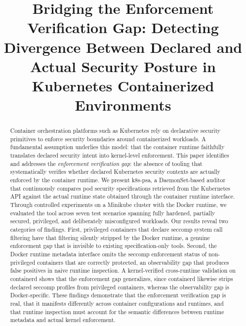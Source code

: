 \documentclass[conference]{IEEEtran}
\begin{document}
\title{Bridging the Enforcement Verification Gap: Detecting Divergence Between Declared and Actual Security Posture in Kubernetes Containerized Environments}

\author{
\and
{}
\and
{}
}

\maketitle

\begin{abstract}
Container orchestration platforms such as Kubernetes rely on declarative security primitives to enforce security boundaries around containerized workloads. A fundamental assumption underlies this model: that the container runtime faithfully translates declared security intent into kernel-level enforcement. This paper identifies and addresses the \emph{enforcement verification gap}: the absence of tooling that systematically verifies whether declared Kubernetes security contexts are actually enforced by the container runtime. We present k8s-psa, a DaemonSet-based auditor that continuously compares pod security specifications retrieved from the Kubernetes API against the actual runtime state obtained through the container runtime interface. Through controlled experiments on a Minikube cluster with the Docker runtime, we evaluated the tool across seven test scenarios spanning fully hardened, partially secured, privileged, and deliberately misconfigured workloads. Our results reveal two categories of findings. First, privileged containers that declare seccomp system call filtering have that filtering silently stripped by the Docker runtime, a genuine enforcement gap that is invisible to existing specification-only tools. Second, the Docker runtime metadata interface omits the seccomp enforcement status of non-privileged containers that are correctly protected, an observability gap that produces false positives in naive runtime inspection. A kernel-verified cross-runtime validation on containerd shows that the enforcement gap generalizes, since containerd likewise strips declared seccomp profiles from privileged containers, whereas the observability gap is Docker-specific. These findings demonstrate that the enforcement verification gap is real, that it manifests differently across container configurations and runtimes, and that runtime inspection must account for the semantic differences between runtime metadata and actual kernel enforcement.
\end{abstract}
\end{document}
